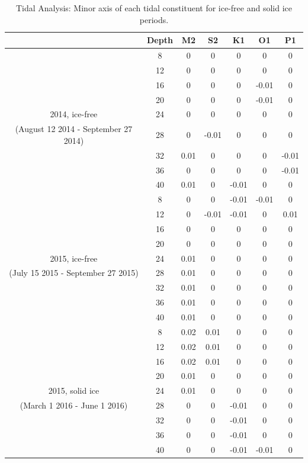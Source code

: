 \documentclass[12pt]{dforeport}
\begin{document}
\begin{table}[ht]
\centering
\caption[Minor Axis of Tidal Constituents]{Tidal Analysis: Minor axis of each tidal constituent for ice-free and solid ice periods.} 
\label{t:minorAxis}
\begin{tabular}{| c | c | c c c c c |}
\hline
& Depth & M2 & S2 & K1 & O1 & P1 \\
\hline
& 8 & 0 & 0 & 0 & 0 & 0 \\
& 12 & 0 & 0 & 0 & 0 & 0 \\
& 16 & 0 & 0 & 0 & -0.01 & 0 \\
& 20 & 0 & 0 & 0 & -0.01 & 0 \\
2014, ice-free & 24 & 0 & 0 & 0 & 0 & 0 \\
(August 12 2014 - September 27 2014) & 28 & 0 & -0.01 & 0 & 0 & 0 \\
& 32 & 0.01 & 0 & 0 & 0 & -0.01 \\
& 36 & 0 & 0 & 0 & 0 & -0.01 \\
& 40 & 0.01 & 0 & -0.01 & 0 & 0 \\
 \hline
& 8 & 0 & 0 & -0.01 & -0.01 & 0 \\
& 12 & 0 & -0.01 & -0.01 & 0 & 0.01 \\
& 16 & 0 & 0 & 0 & 0 & 0 \\
& 20 & 0 & 0 & 0 & 0 & 0 \\
2015, ice-free & 24 & 0.01 & 0 & 0 & 0 & 0 \\
(July 15 2015 - September 27 2015) & 28 & 0.01 & 0 & 0 & 0 & 0 \\
& 32 & 0.01 & 0 & 0 & 0 & 0 \\
& 36 & 0.01 & 0 & 0 & 0 & 0 \\
& 40 & 0.01 & 0 & 0 & 0 & 0 \\
 \hline
& 8 & 0.02 & 0.01 & 0 & 0 & 0  \\
& 12 & 0.02 & 0.01 & 0 & 0 & 0 \\
& 16 & 0.02 & 0.01 & 0 & 0 & 0 \\
& 20 & 0.01 & 0 & 0 & 0 & 0 \\
2015, solid ice & 24 & 0.01 & 0 & 0 & 0 & 0 \\
(March 1 2016 - June 1 2016) & 28 & 0 & 0 & -0.01 & 0 & 0 \\
& 32 & 0 & 0 & -0.01 & 0 & 0 \\
& 36 & 0 & 0 & -0.01 & 0 & 0 \\
& 40 & 0 & 0 & -0.01 & -0.01 & 0 \\
 \hline
\end{tabular}
\end{table}
\end{document}
